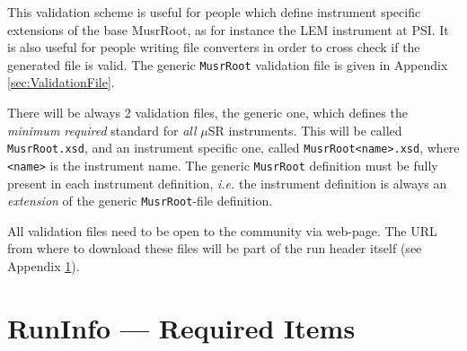 \documentclass[twoside]{article}
\newcommand{\musr}{$\mu$SR\xspace}
\newcommand{\musrroot}{\texttt{MusrRoot}\xspace}
\newcommand{\ie}{\emph{i.e.}\xspace}
\begin{document}
This validation scheme is useful for people which define instrument specific extensions of the base MusrRoot, as for instance the LEM instrument at PSI. It is also useful for people writing file converters in order to cross check if the generated file is valid. The generic \musrroot validation file is given in Appendix \ref{sec:ValidationFile}. 

There will be always 2 validation files, the generic one, which defines the \emph{minimum required} standard for \emph{all} \musr instruments. This will be called \texttt{MusrRoot.xsd}, and an instrument specific one, called \verb!MusrRoot<name>.xsd!, where \verb!<name>! is the instrument name. The generic \musrroot definition must be fully present in each instrument definition, \ie the instrument definition is always an \emph{extension} of the generic \musrroot-file definition.

All validation files need to be open to the community via web-page. The URL from where to download these files will be part of the run header itself (see Appendix \ref{sec:RunInfoRequired}).

\clearpage

\appendix

\section{RunInfo --- Required Items} \label{sec:RunInfoRequired}
\end{document}
